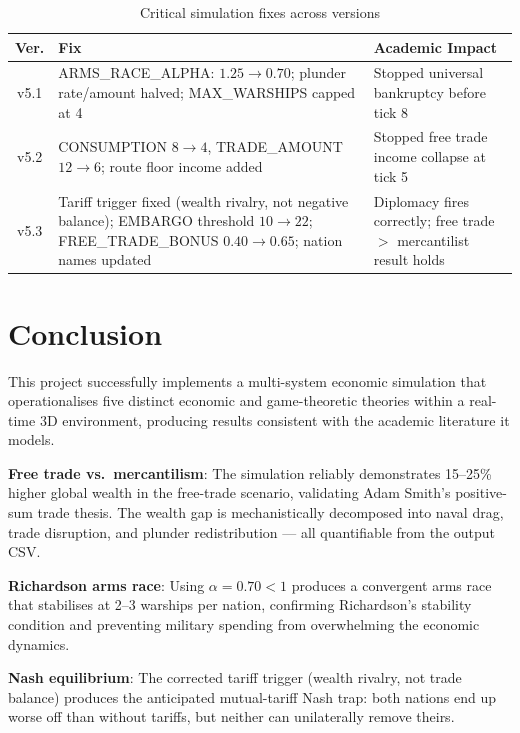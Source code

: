 \documentclass[12pt,a4paper]{article}
\begin{document}
\begin{table}[h]
\centering
\caption{Critical simulation fixes across versions}
\begin{tabular}{|c|p{5.0cm}|p{4.5cm}|}
\hline
\textbf{Ver.} & \textbf{Fix} & \textbf{Academic Impact} \\
\hline
v5.1 & ARMS\_RACE\_ALPHA: $1.25 \to 0.70$; plunder rate/amount halved; MAX\_WARSHIPS capped at 4 & Stopped universal bankruptcy before tick 8 \\
\hline
v5.2 & CONSUMPTION $8\to4$, TRADE\_AMOUNT $12\to6$; route floor income added & Stopped free trade income collapse at tick 5 \\
\hline
v5.3 & Tariff trigger fixed (wealth rivalry, not negative balance); EMBARGO threshold $10\to22$; FREE\_TRADE\_BONUS $0.40\to0.65$; nation names updated & Diplomacy fires correctly; free trade $>$ mercantilist result holds \\
\hline
\end{tabular}
\end{table}

\section{Conclusion}

This project successfully implements a multi-system economic simulation that operationalises five distinct economic and game-theoretic theories within a real-time 3D environment, producing results consistent with the academic literature it models.

\textbf{Free trade vs.\ mercantilism}: The simulation reliably demonstrates 15--25\% higher global wealth in the free-trade scenario, validating Adam Smith's positive-sum trade thesis. The wealth gap is mechanistically decomposed into naval drag, trade disruption, and plunder redistribution --- all quantifiable from the output CSV.

\textbf{Richardson arms race}: Using $\alpha = 0.70 < 1$ produces a convergent arms race that stabilises at 2--3 warships per nation, confirming Richardson's stability condition and preventing military spending from overwhelming the economic dynamics.

\textbf{Nash equilibrium}: The corrected tariff trigger (wealth rivalry, not trade balance) produces the anticipated mutual-tariff Nash trap: both nations end up worse off than without tariffs, but neither can unilaterally remove theirs.
\end{document}
